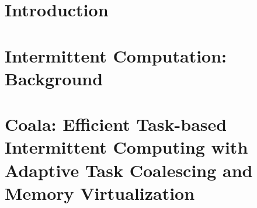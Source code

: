 \documentclass[pageno]{jpaper}
\newcommand{\sys}{Coala\xspace}
\newcommand{\sysfull}{\sys: Efficient Task-based Intermittent Computing with Adaptive Task Coalescing and Memory Virtualization}
\begin{document}



\section{Introduction}
\label{sec:intro}



\section{Intermittent Computation: Background}
\label{sec:background}



\section{\sysfull}
\label{sec:overall_system}
\end{document}
